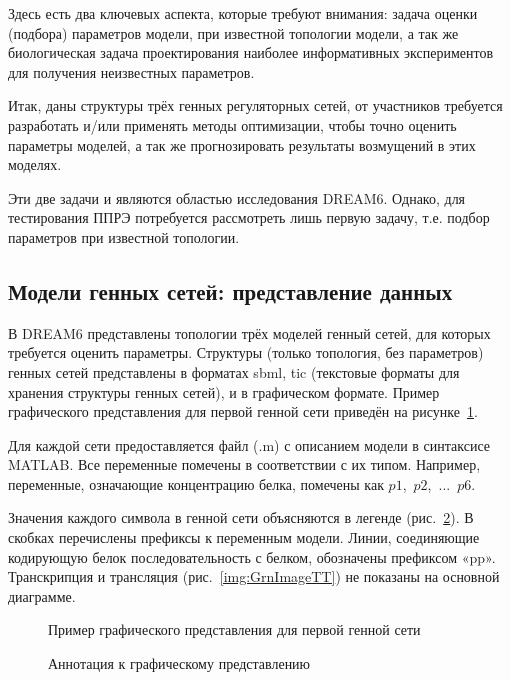 Здесь есть два ключевых аспекта, которые требуют внимания: задача оценки 
(подбора) параметров модели, при известной топологии модели, а так же 
биологическая задача проектирования наиболее информативных экспериментов для 
получения неизвестных параметров.

Итак, даны структуры трёх генных регуляторных сетей, от участников требуется 
разработать и/или применять методы оптимизации, чтобы точно оценить 
параметры моделей, а так же прогнозировать результаты возмущений в этих моделях.

Эти две задачи и являются областью исследования DREAM6. Однако, для тестирования
ППРЭ потребуется рассмотреть лишь первую задачу, т.е. подбор параметров при 
известной топологии.

\subsection{Модели генных сетей: представление данных} \label{s2_2}

В DREAM6 представлены топологии трёх моделей генный сетей, для которых требуется
оценить параметры. Структуры (только топология, без параметров) генных сетей 
представлены в форматах sbml, tic (текстовые форматы для хранения структуры 
генных сетей), и в графическом формате. Пример графического представления для 
первой генной сети приведён на рисунке~\ref{img:GrnImage}.

Для каждой сети предоставляется файл (.m) с описанием модели в 
синтаксисе MATLAB. Все переменные помечены в соответствии с их типом. 
Например, переменные, означающие концентрацию белка, помечены как 
$p1$,~$p2$,~...~$p6$. 

Значения каждого символа в генной сети 
объясняются в легенде (рис.~\ref{img:GrnImageDesc}). В скобках перечислены 
префиксы к переменным модели. Линии, соединяющие кодирующую белок 
последовательность с белком, обозначены префиксом «pp». Транскрипция и 
трансляция (рис.~\ref{img:GrnImageTT}) не показаны на основной диаграмме. 

\begin{figure}[h]
  \caption{Пример графического представления для первой генной сети}
  \label{img:GrnImage}
\end{figure}

\begin{figure}[h]
  \caption{Аннотация к графическому представлению}
  \label{img:GrnImageDesc}
\end{figure}

